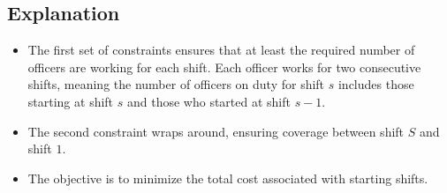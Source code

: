 \documentclass{article}
\begin{document}
\subsection*{Explanation}
\begin{itemize}
    \item The first set of constraints ensures that at least the required number of officers are working for each shift. Each officer works for two consecutive shifts, meaning the number of officers on duty for shift $s$ includes those starting at shift $s$ and those who started at shift $s-1$.
    \item The second constraint wraps around, ensuring coverage between shift $S$ and shift $1$.
    \item The objective is to minimize the total cost associated with starting shifts.
\end{itemize}
\end{document}

